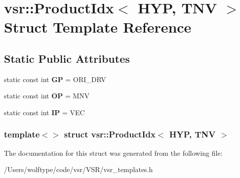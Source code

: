 \hypertarget{structvsr_1_1_product_idx_3_01_h_y_p_00_01_t_n_v_01_4}{\section{vsr\-:\-:Product\-Idx$<$ H\-Y\-P, T\-N\-V $>$ Struct Template Reference}
\label{structvsr_1_1_product_idx_3_01_h_y_p_00_01_t_n_v_01_4}
}
\subsection*{Static Public Attributes}
\begin{DoxyCompactItemize}
\item 
\hypertarget{structvsr_1_1_product_idx_3_01_h_y_p_00_01_t_n_v_01_4_a673824fa74b677228b234672cf1266a0}{static const int {\bfseries G\-P} = O\-R\-I\-\_\-\-D\-R\-V}\label{structvsr_1_1_product_idx_3_01_h_y_p_00_01_t_n_v_01_4_a673824fa74b677228b234672cf1266a0}

\item 
\hypertarget{structvsr_1_1_product_idx_3_01_h_y_p_00_01_t_n_v_01_4_a452ceba92e570b4cad2d5b181ac1ccaa}{static const int {\bfseries O\-P} = M\-N\-V}\label{structvsr_1_1_product_idx_3_01_h_y_p_00_01_t_n_v_01_4_a452ceba92e570b4cad2d5b181ac1ccaa}

\item 
\hypertarget{structvsr_1_1_product_idx_3_01_h_y_p_00_01_t_n_v_01_4_a074c24390f3df40c113cca3ab4aefe87}{static const int {\bfseries I\-P} = V\-E\-C}\label{structvsr_1_1_product_idx_3_01_h_y_p_00_01_t_n_v_01_4_a074c24390f3df40c113cca3ab4aefe87}

\end{DoxyCompactItemize}
\subsubsection*{template$<$$>$ struct vsr\-::\-Product\-Idx$<$ H\-Y\-P, T\-N\-V $>$}



The documentation for this struct was generated from the following file\-:\begin{DoxyCompactItemize}
\item 
/\-Users/wolftype/code/vsr/\-V\-S\-R/vsr\-\_\-templates.\-h\end{DoxyCompactItemize}
